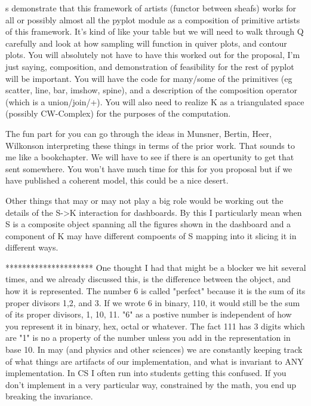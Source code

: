 s demonstrate that this framework of artists (functor between sheafs) works for all or possibly almost all the pyplot module as a composition of primitive artists of this framework. It's kind of like your table but we will need to walk through Q carefully and look at how sampling will function in quiver plots,
and contour plots. You will absolutely not have to have this worked out for the proposal, I'm just saying, composition, and demonstration of feasibility for the rest of pyplot will be important.
You will have the code for many/some of the primitives (eg scatter, line, bar, imshow, spine), and a description of the composition operator (which is a union/join/+). You will also need to realize K as a triangulated space (possibly CW-Complex) for the purposes of the computation.

The fun part for you can go through the ideas in Munsner, Bertin, Heer, Wilkonson interpreting these things in terms of the prior work. That sounds to me like a bookchapter. We will have to see if there is an opertunity to get that sent somewhere. You won't have much time for this for you proposal but if we have published a coherent model, this could be a nice desert.

Other things that may or may not play a big role would be working out the details of the S->K interaction for dashboards. By this I particularly mean when S is a composite object spanning all the figures shown in the dashboard and a component of K may have different compoents of S mapping into it slicing it in different ways.


*********************
One thought I had that might be a blocker we hit several times, and we already discussed this, is the difference between the object, and how it is represented. The number 6 is called "perfect" because it is the sum of its proper divisors 1,2, and 3. If we wrote 6 in binary, 110, it would still be the sum of its proper divisors, 1, 10, 11. "6" as a postive number is independent of how you represent it in binary, hex, octal or whatever. The fact 111 has 3 digits which are "1" is no a property of the number unless you add in the representation in base 10. In may (and physics and other sciences) we are constantly keeping track of what things are artifacts of our implementation, and what is invariant to ANY implementation. In CS I often run into students getting this confused. If you don't implement in a very particular way, constrained by the math, you end up breaking the invariance. 